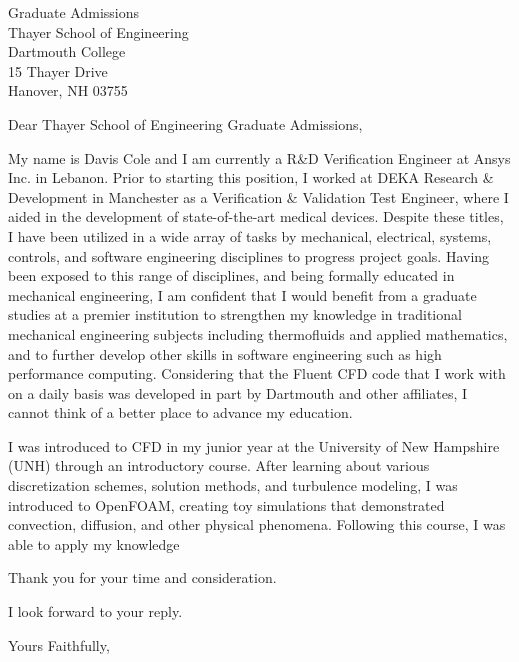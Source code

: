 \documentclass{letter}
\begin{document}
\begin{letter}{Graduate Admissions \\ Thayer School of Engineering \\ Dartmouth College \\ 15 Thayer Drive \\ Hanover, NH 03755}
\opening{Dear Thayer School of Engineering Graduate Admissions,}

My name is Davis Cole and I am currently a R\&D Verification Engineer at Ansys Inc. in Lebanon.
Prior to starting this position, I worked at DEKA Research \& Development in Manchester as a Verification \& Validation
Test Engineer, where I aided in the development of state-of-the-art medical devices. Despite these titles, 
I have been utilized in a wide array of tasks by mechanical, electrical, systems, controls, and software engineering disciplines 
to progress project goals. Having been exposed to this range of disciplines, and being formally educated in mechanical engineering, 
I am confident that I would benefit from a graduate studies at a premier institution to strengthen my knowledge in traditional
mechanical engineering subjects including thermofluids and applied mathematics, and to further develop other skills in software 
engineering such as high performance computing. Considering that the Fluent CFD code that I work with on a daily basis was 
developed in part by Dartmouth and other affiliates, I cannot think of a better place to advance my education.

I was introduced to CFD in my junior year at the University of New Hampshire (UNH) through an introductory course.
After learning about various discretization schemes, solution methods, and turbulence modeling, I was introduced to OpenFOAM, 
creating toy simulations that demonstrated convection, diffusion, and other physical phenomena. Following this course,
I was able to apply my knowledge

Thank you for your time and consideration.

I look forward to your reply.

\closing{Yours Faithfully,}



\end{letter}
\end{document}

